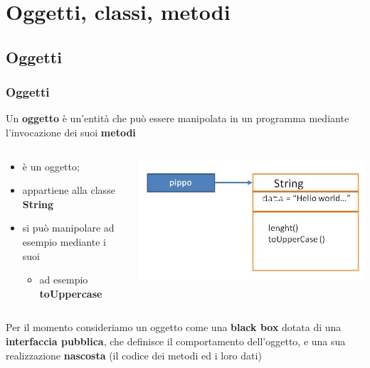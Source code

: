 \section*{Oggetti, classi, metodi}
\begin{frame}
\begin{block}{}
\begin{huge}
\large{\begin{center}
\end{center}}
\end{huge}
\end{block}
\end{frame}
\subsection*{Oggetti}
\begin{frame}
\frametitle{Oggetti}
\begin{block}{}
Un \textbf{oggetto} è un'entità che può essere manipolata in un programma mediante l'invocazione dei suoi \textbf{metodi}
\end{block}
\begin{columns}
\begin{column}{0.5\textwidth}
\begin{block}{}
\begin{itemize}
\item {} è un oggetto;
\item appartiene alla classe \textbf{String}
\item si può manipolare ad esempio mediante i suoi 
\begin{itemize}
\item ad esempio \textbf{toUppercase}
\end{itemize}
\end{itemize}
\end{block}
\end{column}
\begin{column}{0.5\textwidth}
\includegraphics[scale=0.4]{images/classe.jpg}
\end{column}
\end{columns}
\begin{block}{}\footnotesize
Per il momento consideriamo un oggetto come una \textbf{black box} dotata di una \textbf{interfaccia pubblica}, che definisce il comportamento dell'oggetto, e una sua realizzazione \textbf{nascosta} (il codice dei metodi ed i loro dati)
\end{block}
\end{frame}

